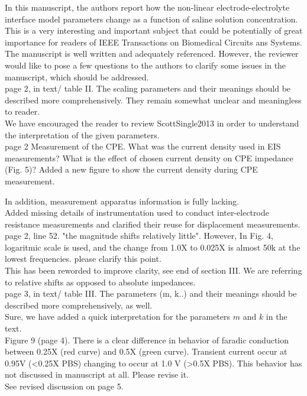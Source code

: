 \documentclass[journal, a4paper]{IEEEtran}
\begin{document}
{\color{blue}
In this manuscript, the authors report how the non-linear electrode-electrolyte interface model parameters change as a function of saline solution concentration. This is a very interesting and important subject that could be potentially of great importance for readers of IEEE Transactions on Biomedical Circuits ans Systems. The manuscript is well written and adequately referenced. However, the reviewer would like to pose a few questions to the authors to clarify some  issues in the manuscript, which should be addressed.\\

page 2, in text/ table II. The scaling parameters and their meanings should be described more comprehensively. They remain somewhat unclear and meaningless to reader.\\
{\color{OliveGreen}
    We have encouraged the reader to review ScottSingle2013 in order to understand the interpretation of the given parameters.
}\\

page 2 Measurement of the CPE. What was the current density used in EIS measurements?
What is the effect of chosen current density on CPE impedance (Fig. 5)?
{\color{OliveGreen}
    Added a new figure to show the current density during CPE measurement.
}

In addition,  measurement apparatus information is fully lacking.\\
{\color{OliveGreen}
    Added missing details of instrumentation used to conduct inter-electrode resistance measurements and clarified their reuse for displacement measurements.
}\\

page 2, line 52. "the magnitude shifts relatively little". However, In Fig. 4, logaritmic scale is used, and the change from 1.0X to 0.025X is almost 50k at the lowest frequencies.
please clarify this point.\\
{\color{OliveGreen}
    This has been reworded to improve clarity, see end of section III. We are referring to relative shifts as opposed to absolute impedances.
}\\

page 3, in text/ table III. The parameters (m, k..) and their meanings should be described more comprehensively, as well.\\
{\color{OliveGreen}
    Sure, we have added a quick interpretation for the parameters $m$ and $k$ in the text.
}\\

Figure 9 (page 4). There is a clear difference in behavior of faradic conduction between 0.25X (red curve) and 0.5X (green curve). Transient current occur at 0.95V (<0.25X PBS) changing to occur at 1.0 V (>0.5X PBS). This behavior has not discussed in manuscript at all. Please revise it.\\
{\color{OliveGreen}
    See revised discussion on page 5.
}\\

}
\end{document}

